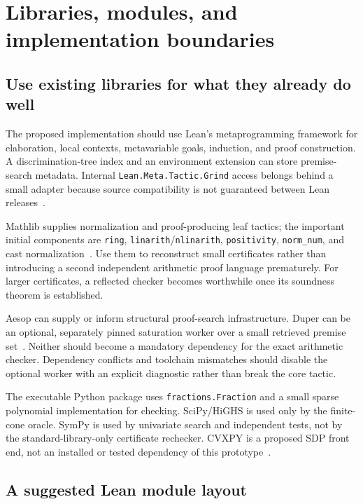 \documentclass[11pt,a4paper]{article}
\theoremstyle{definition}
\newcommand{\code}[1]{\texttt{#1}}
\begin{document}
\section{Libraries, modules, and implementation boundaries}

\subsection{Use existing libraries for what they already do well}

The proposed implementation should use Lean's metaprogramming framework for elaboration, local contexts, metavariable goals, induction, and proof construction. A discrimination-tree index and an environment extension can store premise-search metadata. Internal \code{Lean.Meta.Tactic.Grind} access belongs behind a small adapter because source compatibility is not guaranteed between Lean releases~\cite{grindtypes,grindconfig}.

Mathlib supplies normalization and proof-producing leaf tactics; the important initial components are \code{ring}, \code{linarith}/\code{nlinarith}, \code{positivity}, \code{norm\_num}, and cast normalization~\cite{ring,linarith,positivity}. Use them to reconstruct small certificates rather than introducing a second independent arithmetic proof language prematurely. For larger certificates, a reflected checker becomes worthwhile once its soundness theorem is established.

Aesop can supply or inform structural proof-search infrastructure. Duper can be an optional, separately pinned saturation worker over a small retrieved premise set~\cite{aesop,duper}. Neither should become a mandatory dependency for the exact arithmetic checker. Dependency conflicts and toolchain mismatches should disable the optional worker with an explicit diagnostic rather than break the core tactic.

The executable Python package uses \code{fractions.Fraction} and a small sparse polynomial implementation for checking. SciPy/HiGHS is used only by the finite-cone oracle. SymPy is used by univariate search and independent tests, not by the standard-library-only certificate rechecker. CVXPY is a proposed SDP front end, not an installed or tested dependency of this prototype~\cite{scipy,sympy,cvxpy}.

\subsection{A suggested Lean module layout}
\end{document}
